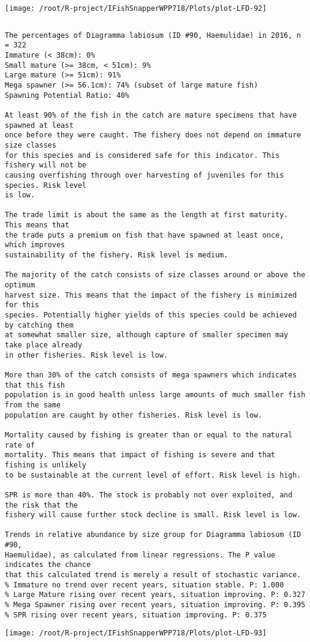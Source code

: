 \documentclass{report}\usepackage[]{graphicx}\usepackage[]{color}
\makeatletter
\def\maxwidth{ %
  \ifdim\Gin@nat@width>\linewidth
    \linewidth
  \else
    \Gin@nat@width
  \fi
}
\newenvironment{kframe}{%
 \def\at@end@of@kframe{}%
 \ifinner\ifhmode%
  \def\at@end@of@kframe{\end{minipage}}%
  \begin{minipage}{\columnwidth}%
 \fi\fi%
 \def\FrameCommand##1{\hskip\@totalleftmargin \hskip-\fboxsep
 \colorbox{shadecolor}{##1}\hskip-\fboxsep
     \hskip-\linewidth \hskip-\@totalleftmargin \hskip\columnwidth}%
 \MakeFramed {\advance\hsize-\width
   \@totalleftmargin\z@ \linewidth\hsize
   \@setminipage}}%
 {\par\unskip\endMakeFramed%
 \at@end@of@kframe}
\newenvironment{knitrout}{}{} %
\makeatother
\begin{document}
\begin{knitrout}
\texttt{[image: /root/R-project/IFishSnapperWPP718/Plots/plot-LFD-92]} 
\begin{kframe}\begin{verbatim}
\end{verbatim}
\end{kframe}
\clearpage
\newpage
\begin{kframe}\begin{verbatim}The percentages of Diagramma labiosum (ID #90, Haemulidae) in 2016, n = 322
Immature (< 38cm): 0%
Small mature (>= 38cm, < 51cm): 9%
Large mature (>= 51cm): 91%
Mega spawner (>= 56.1cm): 74% (subset of large mature fish)
Spawning Potential Ratio: 40%
 
At least 90% of the fish in the catch are mature specimens that have spawned at least
once before they were caught. The fishery does not depend on immature size classes
for this species and is considered safe for this indicator. This fishery will not be
causing overfishing through over harvesting of juveniles for this species. Risk level
is low.

The trade limit is about the same as the length at first maturity.  This means that
the trade puts a premium on fish that have spawned at least once, which improves
sustainability of the fishery. Risk level is medium.

The majority of the catch consists of size classes around or above the optimum
harvest size. This means that the impact of the fishery is minimized for this
species. Potentially higher yields of this species could be achieved by catching them
at somewhat smaller size, although capture of smaller specimen may take place already
in other fisheries. Risk level is low.

More than 30% of the catch consists of mega spawners which indicates that this fish
population is in good health unless large amounts of much smaller fish from the same
population are caught by other fisheries. Risk level is low.
 
Mortality caused by fishing is greater than or equal to the natural rate of
mortality. This means that impact of fishing is severe and that fishing is unlikely
to be sustainable at the current level of effort. Risk level is high.
 
SPR is more than 40%. The stock is probably not over exploited, and the risk that the
fishery will cause further stock decline is small. Risk level is low.
 
Trends in relative abundance by size group for Diagramma labiosum (ID #90,
Haemulidae), as calculated from linear regressions. The P value indicates the chance
that this calculated trend is merely a result of stochastic variance.
% Immature no trend over recent years, situation stable. P: 1.000
% Large Mature rising over recent years, situation improving. P: 0.327
% Mega Spawner rising over recent years, situation improving. P: 0.395
% SPR rising over recent years, situation improving. P: 0.375
\end{verbatim}
\end{kframe}
\texttt{[image: /root/R-project/IFishSnapperWPP718/Plots/plot-LFD-93]} 


\end{knitrout}
\end{document}
